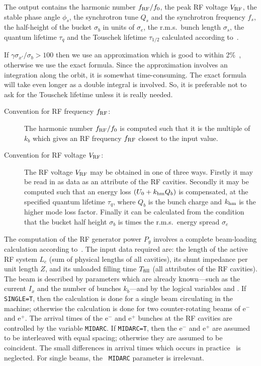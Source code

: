 The output contains the harmonic number \(f_{\rm RF} / f_0\), the peak RF
voltage \(V_{\rm RF}\), the stable phase angle \(\phi_s\), the synchrotron
tune \(Q_s\) and the synchrotron frequency \(f_s\), the half-height of
the bucket \(\sigma_b\) in units of \(\sigma_e\),
the r.m.s.\ bunch length \(\sigma_s\), the
quantum lifetime \(\tau_q \) and the Touschek lifetime \(\tau_{1/2}\)
calculated according to~\cite{B-UV,B-CL,B-RW}.
 
If \(\gamma \sigma_{x'}/\sigma_b > 100\)
 then we use an approximation which is
good to within 2\%~\cite{B-RW}, otherwise we use the exact formula.
Since the approximation involves an integration along the orbit, it is
somewhat time-consuming. The exact formula will take even longer as a
double integral is involved. So, it is preferable not to ask for the
Touschek lifetime unless it is really needed.
 
\begin{description}
 
\item[Convention for RF frequency \(f_{\rm RF}\):] The harmonic number
\(f_{\rm RF} / f_0\) is computed such that it is the multiple
 of \(k_b\) which
gives an RF frequency \(f_{\rm RF}\) closest to the input value.
 
\item[Convention for RF voltage \(V_{\rm RF}\):] The RF voltage \(V_{\rm
RF}\) may be obtained in one of three ways. Firstly it may be read
in as data as an attribute of the RF cavities. Secondly it may
be computed such  that an energy loss
 \((U_0 +  k_{\rm hm} Q_b)\) is
compensated, at the specified quantum lifetime \(\tau_q\), where
 \(Q_b\)  is the bunch charge and \(k_{\rm hm}\) is the higher mode loss
factor. Finally it can be calculated from the condition that the bucket
  half height \(\sigma_b\) is
 times the r.m.s.\ energy spread \(\sigma _e\)
\end{description}
 
The computation of the RF generator power \(P_g\) involves a
complete beam-loading calculation according to~\cite{B-PW}. The input
data required are: the length of the active RF system \(L_c\) (sum of
physical lengths of all cavities),
its shunt impedance per unit length \(Z\), and its unloaded filling time
\(T_{\rm fill}\) (all attributes of the RF cavities).
The beam is described by parameters which are already
known---such as the current \(I_x\) and the number of bunches
\(k_b\)---and by the logical variables  and
.
If {\tt SINGLE=T}, then the calculation is done for a single beam
circulating in the machine; otherwise the calculation is done for two
counter-rotating beams of e\({}^-\) and e\({}^+\). The arrival times of the
e\({}^-\) and e\({}^+\) bunches at the RF cavities are controlled by the
variable {\tt MIDARC}. If {\tt MIDARC=T}, then the e\({}^-\) and e\({}^+\) are
assumed to be interleaved with equal spacing; otherwise they are
assumed to be coincident. The small differences in arrival times which
occurs in practice~\cite{B-BH} is neglected. For single beams, the {\tt
MIDARC} parameter is irrelevant.
 
